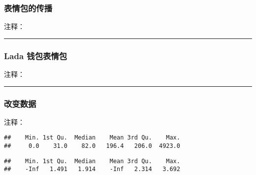 \documentclass[]{article}
\newenvironment{Shaded}{\begin{snugshade}}{\end{snugshade}}
\newcommand{\DecValTok}[1]{\textcolor[rgb]{0.00,0.00,0.81}{#1}}
\newcommand{\KeywordTok}[1]{\textcolor[rgb]{0.13,0.29,0.53}{\textbf{#1}}}
\newcommand{\NormalTok}[1]{#1}
\newcommand{\OperatorTok}[1]{\textcolor[rgb]{0.81,0.36,0.00}{\textbf{#1}}}
\begin{document}
\subsubsection{表情包的传播}

注释：

\begin{center}\rule{0.5\linewidth}{\linethickness}\end{center}

\hypertarget{lada-}{%
\subsubsection{Lada 钱包表情包}\label{lada-}}

注释：

\begin{center}\rule{0.5\linewidth}{\linethickness}\end{center}

\subsubsection{改变数据}

注释：

\begin{Shaded}
\end{Shaded}

\begin{verbatim}
##    Min. 1st Qu.  Median    Mean 3rd Qu.    Max. 
##     0.0    31.0    82.0   196.4   206.0  4923.0
\end{verbatim}

\begin{Shaded}
\end{Shaded}

\begin{verbatim}
##    Min. 1st Qu.  Median    Mean 3rd Qu.    Max. 
##    -Inf   1.491   1.914    -Inf   2.314   3.692
\end{verbatim}

\begin{Shaded}
\end{Shaded}
\end{document}
